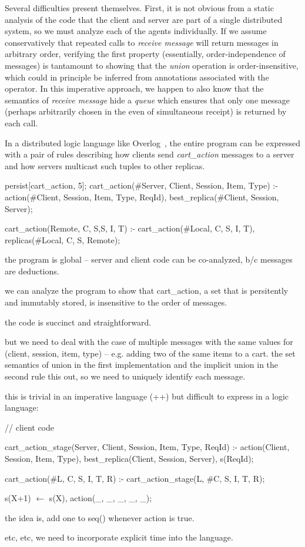 Several difficulties present themselves.
First, it is not obvious from a static analysis of the code that the client and server are
part of a single distributed system, so we must analyze each of the agents individually.
If we assume conservatively that repeated calls to {\em receive message} will return messages in
arbitrary order, verifying the first property (essentially, order-independence of messages)
is tantamount to showing that the {\em union} operation is
order-insensitive, which could in principle be inferred from annotations associated
with the operator.
In this imperative approach, we happen to also know that the semantics of {\em receive message}
hide a {\em queue} which ensures that only one message (perhaps arbitrarily chosen in the
even of simultaneous receipt) is returned by each call.







In a distributed logic language like Overlog~\cite{boomanalytics}, the entire program 
can be expressed with a pair of rules describing how clients send {\em cart\_action}
messages to a server and how servers multicast such tuples to other replicas.

\begin{Dedalus}
persist[cart_action, 5];
cart\_action(#Server, Client, Session, Item, Type) :-
  action(#Client, Session, Item, Type, ReqId),
  best_replica(#Client, Session, Server);

cart\_action(Remote, C, S,S, I, T) :-
  cart\_action(#Local, C, S, I, T),
  replicas(#Local, C, S, Remote);
\end{Dedalus}

the program is global -- server and client code can be co-analyzed, b/c messages are deductions.

we can analyze the program to show that cart\_action, a set that is persitently and immutably
stored, is insensitive to the order of messages.

the code is succinct and straightforward. 

but we need to deal with the case of multiple messages with the same values for
(client, session, item, type) -- e.g. adding two of the same items to a cart.  the set semantics
of union in the first implementation and the implicit union in the second rule this out,
so we need to uniquely identify each message.

this is trivial in an imperative language (++) but difficult to express in a logic language:

\begin{Dedalus}
// client code

cart_action_stage(Server, Client, Session, Item, Type, ReqId) :-
  action(Client, Session, Item, Type),
  best_replica(Client, Session, Server),
  s(ReqId);

cart_action(#L, C, S, I, T, R) :-
  cart_action_stage(L, #C, S, I, T, R);

s(X+1) \(\leftarrow\)  s(X), action(_, _, _, _, _);
\end{Dedalus}

the idea is, add one to seq() whenever action is true.

etc, etc, we need to incorporate explicit time into the language.

